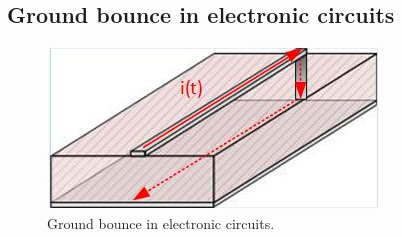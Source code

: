 \documentclass{ximera}
\begin{document}
\begin{example}
\subsection{Ground bounce in electronic circuits}


\begin{figure}[htbp]
\begin{center}
\includegraphics[scale=0.5]{../jpg/GroundBounce.jpg}
\end{center}
\caption{Ground bounce in electronic circuits. }
\label{MutualInduc6}
\end{figure}

\end{example}
\end{document}
